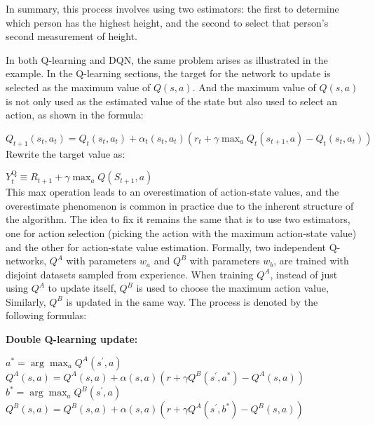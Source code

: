 \documentclass{article}
\begin{document}
In summary, this process involves using two estimators: the first to determine which person has the highest height, and the second to select that person's second measurement of height.

In both Q-learning and DQN, the same problem arises as illustrated in the example. In the Q-learning sections, the target for the network to update is selected as the maximum value of $Q(s,a)$. And the maximum value of $Q(s,a)$ is not only used as the estimated value of the state but also used to select an action, as shown in the formula:

\hspace*{\fill}

$Q_{t+1}\left(s_t, a_t\right)=Q_t\left(s_t, a_t\right)+\alpha_t\left(s_t, a_t\right)\left(r_t+\gamma \max _a Q_t\left(s_{t+1}, a\right)-Q_t\left(s_t, a_t\right)\right)$\\

Rewrite the target value as:

\hspace*{\fill}

$Y_t^{\mathrm{Q}} \equiv R_{t+1}+\gamma \max _a Q\left(S_{t+1}, a\right)$\\


This max operation leads to an overestimation of action-state values, and the overestimate phenomenon is common in practice due to the inherent structure of the algorithm. The idea to fix it remains the same that is to use two estimators, one for action selection (picking the action with the maximum action-state value) and the other for action-state value estimation. Formally, two independent Q-networks, $Q^A$ with parameters $w_a$ and $Q^B$ with parameters $w_b$, are trained with disjoint datasets sampled from experience. When training $Q^A$, instead of just using $Q^A$ to update itself, $Q^B$ is used to choose the maximum action value, Similarly, $Q^B$ is updated in the same way. The process is denoted by the following formulas:


\hspace*{\fill}

\begin{mdframed}[hidealllines=false,backgroundcolor=white!20]
        \textbf{Double Q-learning update:}

\hspace*{\fill}

$a^*=\arg \max _a Q^A\left(s^{\prime}, a\right)$\\

$Q^A(s, a)= Q^A(s, a)+\alpha(s, a)\left(r+\gamma Q^B\left(s^{\prime}, a^*\right)-Q^A(s, a)\right)$ \\

$b^*=\arg \max _a Q^B\left(s^{\prime}, a\right)$\\

$Q^B(s, a) = Q^B(s, a)+\alpha(s, a)\left(r+\gamma Q^A\left(s^{\prime}, b^*\right)-Q^B(s, a)\right)$\\

\end{mdframed}
\end{document}
